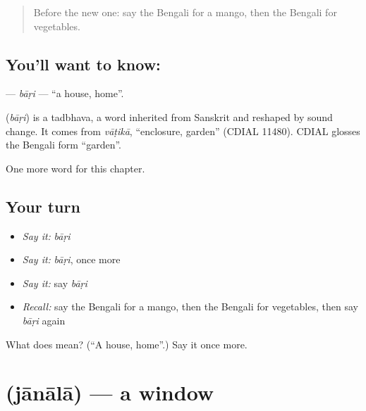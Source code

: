\label{lesson:BN-C59-bari}



\begin{quote}
Before the new one: say the Bengali for a mango, then the Bengali for vegetables.
\end{quote}

\subsection*{You'll want to know: }
\textbf{} — \emph{bāṛi} — \textquotedblleft{}a house, home\textquotedblright{}.

\begin{cousinweb}
\textbf{} (\emph{bāṛi}) is a tadbhava, a word inherited from Sanskrit and reshaped by sound change. It comes from \emph{vāṭikā}, \textquotedblleft{}enclosure, garden\textquotedblright{} (CDIAL 11480). CDIAL glosses the Bengali form \textquotedblleft{}garden\textquotedblright{}.
\end{cousinweb}

\begin{grammarlens}[title={What you've built}]
One more word for this chapter.
\end{grammarlens}

\subsection*{Your turn}
\begin{itemize}
\raggedright
  \item \emph{Say it:} \emph{bāṛi}
  \item \emph{Say it:} \emph{bāṛi}, once more
  \item \emph{Say it:} say \emph{bāṛi}
  \item \emph{Recall:} say the Bengali for a mango, then the Bengali for vegetables, then say \emph{bāṛi} again
\end{itemize}

\begin{tcolorbox}[breakable,colback=teal!4,colframe=teal!35!black,title={Before you move on}]
What does  mean? (\textquotedblleft{}A house, home\textquotedblright{}.) Say it once more.
\end{tcolorbox}
\section[\texorpdfstring{\bn{জানালা} (jānālā)}{জানালা (jānālā)}]{ (jānālā) — a window}

